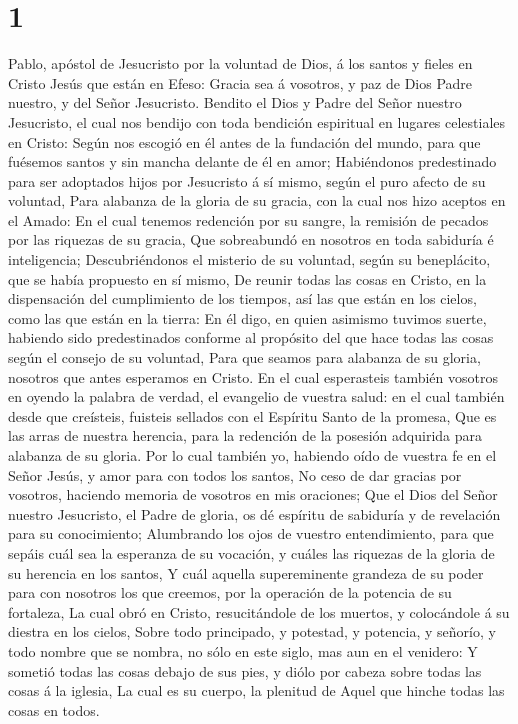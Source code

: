 \hypertarget{section}{%
\section{1}\label{section}}

 Pablo, apóstol de Jesucristo por la voluntad de Dios, á
los santos y fieles en Cristo Jesús que están en Efeso: 
Gracia sea á vosotros, y paz de Dios Padre nuestro, y del Señor
Jesucristo.  Bendito el Dios y Padre del Señor nuestro
Jesucristo, el cual nos bendijo con toda bendición espiritual en lugares
celestiales en Cristo:  Según nos escogió en él antes de
la fundación del mundo, para que fuésemos santos y sin mancha delante de
él en amor;  Habiéndonos predestinado para ser adoptados
hijos por Jesucristo á sí mismo, según el puro afecto de su voluntad,
 Para alabanza de la gloria de su gracia, con la cual nos
hizo aceptos en el Amado:  En el cual tenemos redención
por su sangre, la remisión de pecados por las riquezas de su gracia,
 Que sobreabundó en nosotros en toda sabiduría é
inteligencia;  Descubriéndonos el misterio de su voluntad,
según su beneplácito, que se había propuesto en sí mismo,
 De reunir todas las cosas en Cristo, en la dispensación
del cumplimiento de los tiempos, así las que están en los cielos, como
las que están en la tierra:  En él digo, en quien
asimismo tuvimos suerte, habiendo sido predestinados conforme al
propósito del que hace todas las cosas según el consejo de su voluntad,
 Para que seamos para alabanza de su gloria, nosotros que
antes esperamos en Cristo.  En el cual esperasteis
también vosotros en oyendo la palabra de verdad, el evangelio de vuestra
salud: en el cual también desde que creísteis, fuisteis sellados con el
Espíritu Santo de la promesa,  Que es las arras de
nuestra herencia, para la redención de la posesión adquirida para
alabanza de su gloria.  Por lo cual también yo, habiendo
oído de vuestra fe en el Señor Jesús, y amor para con todos los santos,
 No ceso de dar gracias por vosotros, haciendo memoria de
vosotros en mis oraciones;  Que el Dios del Señor nuestro
Jesucristo, el Padre de gloria, os dé espíritu de sabiduría y de
revelación para su conocimiento;  Alumbrando los ojos de
vuestro entendimiento, para que sepáis cuál sea la esperanza de su
vocación, y cuáles las riquezas de la gloria de su herencia en los
santos,  Y cuál aquella supereminente grandeza de su
poder para con nosotros los que creemos, por la operación de la potencia
de su fortaleza,  La cual obró en Cristo, resucitándole
de los muertos, y colocándole á su diestra en los cielos,
 Sobre todo principado, y potestad, y potencia, y
señorío, y todo nombre que se nombra, no sólo en este siglo, mas aun en
el venidero:  Y sometió todas las cosas debajo de sus
pies, y diólo por cabeza sobre todas las cosas á la iglesia,
 La cual es su cuerpo, la plenitud de Aquel que hinche
todas las cosas en todos.

